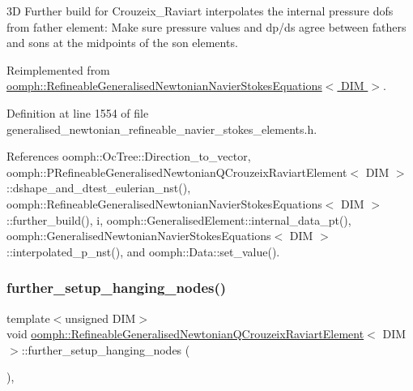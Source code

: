 3D Further build for Crouzeix\+\_\+\+Raviart interpolates the internal pressure dofs from father element\+: Make sure pressure values and dp/ds agree between fathers and sons at the midpoints of the son elements. 

Reimplemented from \hyperlink{classoomph_1_1RefineableGeneralisedNewtonianNavierStokesEquations_a53a4c5277d517f5df48df7c1953b2b02}{oomph\+::\+Refineable\+Generalised\+Newtonian\+Navier\+Stokes\+Equations$<$ D\+I\+M $>$}.



Definition at line 1554 of file generalised\+\_\+newtonian\+\_\+refineable\+\_\+navier\+\_\+stokes\+\_\+elements.\+h.



References oomph\+::\+Oc\+Tree\+::\+Direction\+\_\+to\+\_\+vector, oomph\+::\+P\+Refineable\+Generalised\+Newtonian\+Q\+Crouzeix\+Raviart\+Element$<$ D\+I\+M $>$\+::dshape\+\_\+and\+\_\+dtest\+\_\+eulerian\+\_\+nst(), oomph\+::\+Refineable\+Generalised\+Newtonian\+Navier\+Stokes\+Equations$<$ D\+I\+M $>$\+::further\+\_\+build(), i, oomph\+::\+Generalised\+Element\+::internal\+\_\+data\+\_\+pt(), oomph\+::\+Generalised\+Newtonian\+Navier\+Stokes\+Equations$<$ D\+I\+M $>$\+::interpolated\+\_\+p\+\_\+nst(), and oomph\+::\+Data\+::set\+\_\+value().

\mbox{\label{classoomph_1_1RefineableGeneralisedNewtonianQCrouzeixRaviartElement_a7c7296ef46ec95a58de4b24201e7d7c1}} 
\subsubsection{\texorpdfstring{further\+\_\+setup\+\_\+hanging\+\_\+nodes()}{further\_setup\_hanging\_nodes()}}
{\footnotesize\ttfamily template$<$unsigned D\+IM$>$ \\
void \hyperlink{classoomph_1_1RefineableGeneralisedNewtonianQCrouzeixRaviartElement}{oomph\+::\+Refineable\+Generalised\+Newtonian\+Q\+Crouzeix\+Raviart\+Element}$<$ D\+IM $>$\+::further\+\_\+setup\+\_\+hanging\+\_\+nodes (\begin{DoxyParamCaption}{ }\end{DoxyParamCaption})\hspace{0.3cm}{\ttfamily [inline]}, {\ttfamily [virtual]}}



